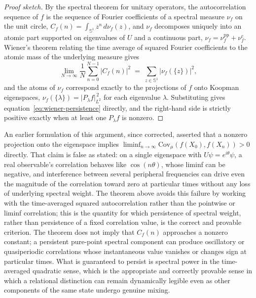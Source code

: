 \documentclass[11pt]{article}
\begin{document}
\begin{proof}[Proof sketch]
By the spectral theorem for unitary operators, the autocorrelation sequence of $f$ is the sequence of Fourier coefficients of a spectral measure $\nu_f$ on the unit circle, $C_f(n) = \int_{\mathbb S^1} z^n \, d\nu_f(z)$, and $\nu_f$ decomposes uniquely into an atomic part supported on eigenvalues of $U$ and a continuous part, $\nu_f = \nu_f^{\mathrm{pp}} + \nu_f^{\mathrm c}$. Wiener's theorem relating the time average of squared Fourier coefficients to the atomic mass of the underlying measure gives
\begin{equation}
\lim_{N \to \infty} \frac{1}{N} \sum_{n=0}^{N-1} |C_f(n)|^2 \;=\; \sum_{z \in \mathbb S^1} \big|\nu_f(\{z\})\big|^2,
\end{equation}
and the atoms of $\nu_f$ correspond exactly to the projections of $f$ onto Koopman eigenspaces, $\nu_f(\{\lambda\}) = \big|P_\lambda f\big|_{L^2}^{\,2}$ for each eigenvalue $\lambda$. Substituting gives equation~\eqref{eq:wiener-persistence} directly, and the right-hand side is strictly positive exactly when at least one $P_\lambda f$ is nonzero.
\end{proof}

An earlier formulation of this argument, since corrected, asserted that a nonzero projection onto the eigenspace implies $\liminf_{n \to \infty} \mathrm{Cov}_\mu(f(X_0), f(X_n)) > 0$ directly. That claim is false as stated: on a single eigenspace with $U\psi = e^{i\theta}\psi$, a real observable's correlation behaves like $\cos(n\theta)$, whose liminf can be negative, and interference between several peripheral frequencies can drive even the magnitude of the correlation toward zero at particular times without any loss of underlying spectral weight. The theorem above avoids this failure by working with the time-averaged squared autocorrelation rather than the pointwise or liminf correlation; this is the quantity for which persistence of spectral weight, rather than persistence of a fixed correlation value, is the correct and provable criterion. The theorem does not imply that $C_f(n)$ approaches a nonzero constant; a persistent pure-point spectral component can produce oscillatory or quasiperiodic correlations whose instantaneous value vanishes or changes sign at particular times. What is guaranteed to persist is spectral power in the time-averaged quadratic sense, which is the appropriate and correctly provable sense in which a relational distinction can remain dynamically legible even as other components of the same state undergo genuine mixing.
\end{document}
